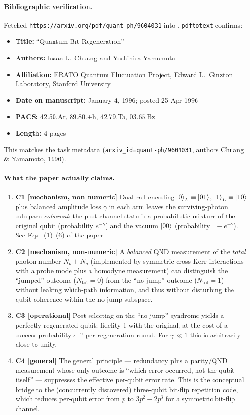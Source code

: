 \documentclass[11pt]{article}
\begin{document}
\paragraph{Bibliographic verification.}
Fetched \texttt{https://arxiv.org/pdf/quant-ph/9604031} into
.  \texttt{pdftotext} confirms:
\begin{itemize}
    \item \textbf{Title:} ``Quantum Bit Regeneration''
    \item \textbf{Authors:} Isaac L.~Chuang and Yoshihisa Yamamoto
    \item \textbf{Affiliation:} ERATO Quantum Fluctuation Project, Edward
    L.~Ginzton Laboratory, Stanford University
    \item \textbf{Date on manuscript:} January 4, 1996; posted 25 Apr 1996
    \item \textbf{PACS:} 42.50.Ar, 89.80.+h, 42.79.Ta, 03.65.Bz
    \item \textbf{Length:} 4 pages
\end{itemize}
This matches the task metadata (\texttt{arxiv\_id=quant-ph/9604031}, authors
Chuang \& Yamamoto, 1996).

\paragraph{What the paper actually claims.}
\begin{enumerate}
    \item \textbf{C1 [mechanism, non-numeric]} Dual-rail encoding
    $\ket{0}_L\equiv\ket{01}$, $\ket{1}_L\equiv\ket{10}$ plus balanced
    amplitude loss $\gamma$ in each arm leaves the surviving-photon
    subspace \emph{coherent}: the post-channel state is a probabilistic
    mixture of the original qubit (probability $e^{-\gamma}$) and the
    vacuum $\ket{00}$ (probability $1-e^{-\gamma}$).  See Eqs.~(1)--(6) of
    the paper.
    \item \textbf{C2 [mechanism, non-numeric]} A \emph{balanced} QND
    measurement of the \emph{total} photon number $N_a+N_{\bar a}$
    (implemented by symmetric cross-Kerr interactions with a probe mode
    plus a homodyne measurement) can distinguish the ``jumped'' outcome
    ($N_{\text{tot}}=0$) from the ``no jump'' outcome ($N_{\text{tot}}=1$)
    without leaking which-path information, and thus without disturbing
    the qubit coherence within the no-jump subspace.
    \item \textbf{C3 [operational]} Post-selecting on the ``no-jump''
    syndrome yields a perfectly regenerated qubit: fidelity 1 with the
    original, at the cost of a success probability $e^{-\gamma}$ per
    regeneration round.  For $\gamma\ll 1$ this is arbitrarily close to
    unity.
    \item \textbf{C4 [general]} The general principle --- redundancy plus
    a parity/QND measurement whose only outcome is ``which error occurred,
    not the qubit itself'' --- suppresses the effective per-qubit error
    rate. This is the conceptual bridge to the (concurrently discovered)
    three-qubit bit-flip repetition code, which reduces per-qubit error
    from $p$ to $3p^{2}-2p^{3}$ for a symmetric bit-flip channel.
\end{enumerate}
\end{document}
